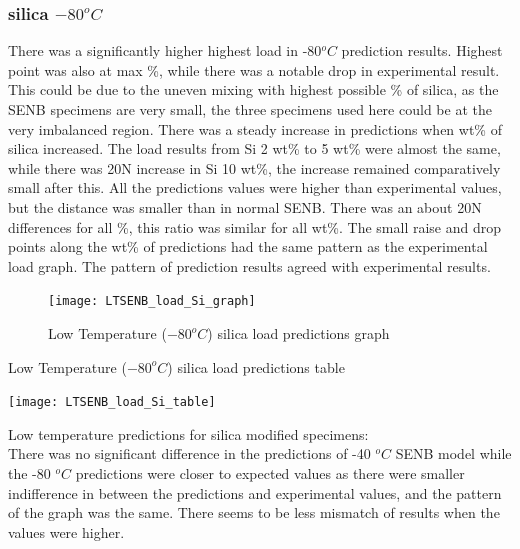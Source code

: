 \documentclass[numbers=noendperiod,chapterprefix=on]{icldt} %
\begin{document}
\subsubsection{silica $ -80 ^{o}C$}
There was a significantly higher highest load in -80$^{o}C$ prediction results. Highest point was also at max \%, while there was a notable drop in experimental result. This could be due to the uneven mixing with highest possible \% of silica, as the SENB specimens are very small, the three specimens used here could be at the very imbalanced region. There was a steady increase in predictions when wt\% of silica increased. The load results from Si 2 wt\% to 5 wt\% were almost the same, while there was 20N increase in Si 10 wt\%, the increase remained comparatively small after this. All the predictions values were higher than experimental values, but the distance was smaller than in normal SENB. There was an about 20N differences for all \%, this ratio was similar for all wt\%.
The small raise and drop points along the wt\% of predictions had the same pattern as the experimental load graph. The pattern of prediction results agreed with experimental results. 

\begin{figure}[!hp]
  \centering
  \texttt{[image: LTSENB\_load\_Si\_graph]}\label{LTSENB_load_Si_80_graph}
  \caption{Low Temperature ($ -80 ^{o}C$) silica load predictions graph}
  \end{figure}

 
 \begin{table}
   \centering
   \caption{Low Temperature ($ -80 ^{o}C$) silica load predictions table}\label{LTSENB_load_80_Si_table}
   \texttt{[image: LTSENB\_load\_Si\_table]}
   \end{table}
   

Low temperature predictions for silica modified specimens: \\
There was no significant difference in the predictions of -40 $^{o}C$ SENB model while the -80 $^{o}C$ predictions were closer to expected values as there were smaller indifference in between the predictions and experimental values, and the pattern of the graph was the same. There seems to be less mismatch of results when the values were higher.
\end{document}
